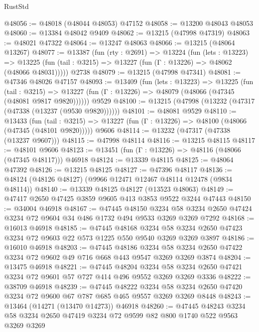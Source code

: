 \begin{lexlean}{RustStd}
\begin{coremodule}
@48056 := @48018 (@48044 @48053) @47152
@48058 := @13200 @48043 @48053
@48060 := @13384 @48042 @9409
@48062 := @13215 (@47998 @47319)
@48063 := @48021 @47322
@48064 := @13247 @48063
@48066 := @13215 (@48064 @13267)
@48077 := @13387
    (fun (rty : @2691) =>
    @13224
      (fun (lets : @13223) =>
      @13225 (fun (tail : @3215) => @13227 (fun (Γ : @13226) => @48062 (@48066 @48031)))))
    @2738
@48079 := @13215 (@47998 @47341)
@48081 := @47346 @48026 @47157
@48093 := @13409
    (fun (lets : @13223) =>
    @13225
      (fun (tail : @3215) =>
      @13227 (fun (Γ : @13226) => @48079 (@48066 (@47345 (@48081 @9817 @9820))))))
    @9529
@48100 := @13215 (@47998 (@13232 (@47317 (@47338 (@13237 (@9530 @9820))))))
@48101 := @48081 @9529
@48110 := @13433
    (fun (tail : @3215) => @13227 (fun (Γ : @13226) => @48100 (@48066 (@47345 (@48101 @9820)))))
    @9606
@48114 := @13232 (@47317 (@47338 (@13237 @9607)))
@48115 := @47998 @48114
@48116 := @13215 @48115
@48117 := @48101 @9606
@48123 := @13451 (fun (Γ : @13226) => @48116 (@48066 (@47345 @48117))) @46918
@48124 := @13339 @48115
@48125 := @48064 @47392
@48126 := @13215 @48125
@48127 := @47396 @48117
@48136 := @48124 (@48126 @48127) (@9966 @12471 @12467 @48114 @12478 (@9834 @48114))
@48140 := @13339 @48125 @48127 (@13523 @48063)
@48149 := @47417 @2650 @47425 @3859 @9605 @413 @3853 @9522 @3244 @47443
@48150 := @34004 @46918
@48167 := @47445
    @48150
    @3234
    @58
    @3234
    @2650
    @47424
    @3234
    @72
    @9604
    @34
    @486
    @1732
    @494
    @9533
    @3269
    @3269
    @7292
@48168 := @16013 @46918
@48185 := @47445
    @48168
    @3234
    @58
    @3234
    @2650
    @47423
    @3234
    @72
    @9603
    @22
    @573
    @1225
    @550
    @9540
    @3269
    @3269
    @3897
@48186 := @16010 @46918
@48203 := @47445
    @48186
    @3234
    @58
    @3234
    @2650
    @47422
    @3234
    @72
    @9602
    @49
    @716
    @668
    @443
    @9547
    @3269
    @3269
    @3874
@48204 := @13475 @46918
@48221 := @47445
    @48204
    @3234
    @58
    @3234
    @2650
    @47421
    @3234
    @72
    @9601
    @57
    @727
    @414
    @496
    @9552
    @3269
    @3269
    @3336
@48222 := @38709 @46918
@48239 := @47445
    @48222
    @3234
    @58
    @3234
    @2650
    @47420
    @3234
    @72
    @9600
    @67
    @787
    @685
    @465
    @9557
    @3269
    @3269
    @8448
@48243 := @13464 (@14271 (@13470 @14273)) @46918
@48260 := @47445
    @48243
    @3234
    @58
    @3234
    @2650
    @47419
    @3234
    @72
    @9599
    @82
    @800
    @1740
    @522
    @9563
    @3269
    @3269

\end{coremodule}
\end{lexlean}
